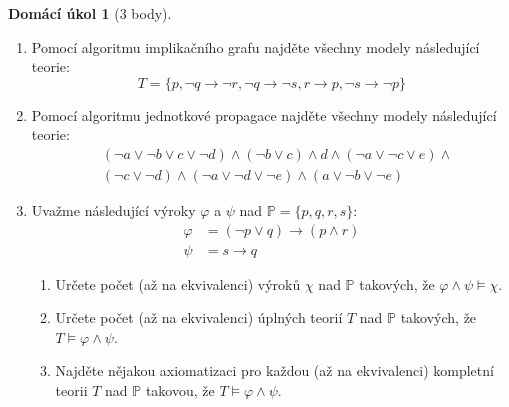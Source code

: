 \documentclass[a4paper]{article}
\theoremstyle{definition}
\newtheorem*{ukol}{Domácí úkol}
\begin{document}
\medskip\begin{ukol}[3 body]{\,}
\begin{enumerate}[label=\arabic*.]
\item Pomocí algoritmu implikačního grafu najděte všechny modely následující teorie:
$$
T=\{p,\neg q \to \neg r,\neg q \to \neg s,r \to p,\neg s \to \neg p\}
$$

\item Pomocí algoritmu jednotkové propagace najděte všechny modely následující teorie:
\begin{align*}
    &(\neg a \vee \neg b \vee c \vee \neg d)\wedge(\neg b \vee c)\wedge d \wedge (\neg a \vee \neg c \vee e)\wedge \\
    &(\neg c \vee \neg d)\wedge(\neg a \vee \neg d \vee \neg e)\wedge(a\vee \neg b \vee\neg e)
\end{align*}

\item Uvažme následující výroky $\varphi$ a $\psi$ nad $\mathbb P=\{p, q, r, s\}$:
\begin{align*}
    \varphi &= (\neg p \vee  q)\to(p\wedge r)\\
    \psi &= s\to q
\end{align*}
\begin{enumerate}
    \item Určete počet (až na ekvivalenci) výroků $\chi$ nad $\mathbb P$ takových, že $\varphi\wedge\psi\models\chi$.
    \item Určete počet (až na ekvivalenci) úplných teorií $T$ nad $\mathbb P$ takových, že $T\models\varphi\wedge\psi$.
    \item Najděte nějakou axiomatizaci pro každou (až na ekvivalenci) kompletní teorii $T$ nad $\mathbb P$ takovou, že $T\models\varphi\wedge\psi$.
\end{enumerate}
\end{enumerate} 
\end{ukol}
\end{document}

